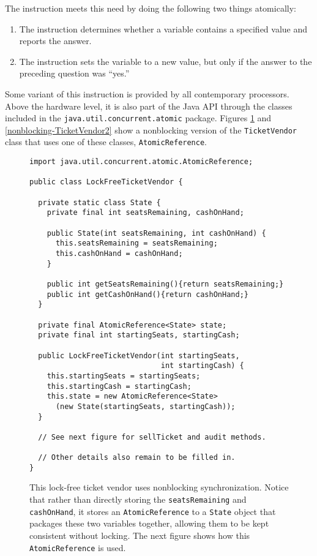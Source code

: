 The  instruction meets this need by doing the following two things atomically:
\begin{enumerate}
\item The instruction determines whether a variable contains a specified value and reports the answer.
\item The instruction sets the variable to a new value, but only if the answer to the preceding question was ``yes.''
\end{enumerate}
Some variant of this instruction is provided by all contemporary processors.  Above the hardware
level, it is also part of the Java API through the classes included in the \texttt{java.util.concurrent.atomic} package.
Figures \ref{nonblocking-TicketVendor1} and \ref{nonblocking-TicketVendor2} show a nonblocking version of the \texttt{TicketVendor} class that uses one
of these classes, \texttt{AtomicReference}.
\begin{figure}
\begin{verbatim}
import java.util.concurrent.atomic.AtomicReference;

public class LockFreeTicketVendor { 
    
  private static class State {
    private final int seatsRemaining, cashOnHand;
    
    public State(int seatsRemaining, int cashOnHand) {
      this.seatsRemaining = seatsRemaining;
      this.cashOnHand = cashOnHand;
    }

    public int getSeatsRemaining(){return seatsRemaining;}
    public int getCashOnHand(){return cashOnHand;}
  }

  private final AtomicReference<State> state;
  private final int startingSeats, startingCash;

  public LockFreeTicketVendor(int startingSeats,
                              int startingCash) {
    this.startingSeats = startingSeats;
    this.startingCash = startingCash;
    this.state = new AtomicReference<State>
      (new State(startingSeats, startingCash));
  }

  // See next figure for sellTicket and audit methods.

  // Other details also remain to be filled in.
}
\end{verbatim}
\caption{This lock-free ticket vendor uses nonblocking synchronization.
Notice that rather than directly storing the \texttt{seatsRemaining}
and \texttt{cashOnHand}, it stores an \texttt{AtomicReference} to a
\texttt{State} object that packages these two variables together,
allowing them to be kept consistent without locking.
The next figure shows how this \texttt{AtomicReference} is used.}\label{nonblocking-TicketVendor1}
\end{figure}
